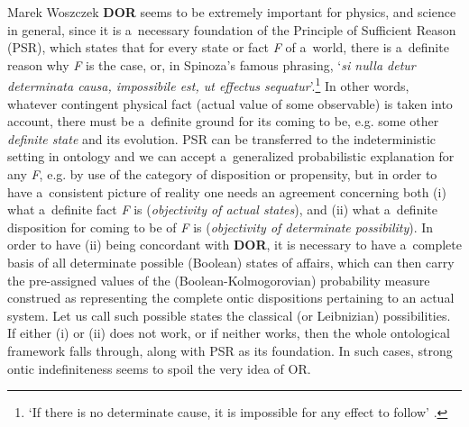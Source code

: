 \begin{artengenv}{Marek Woszczek}
\textbf{DOR} seems to be extremely important for physics, and science in general, since it is a~necessary foundation of the Principle of Sufficient Reason (PSR), which states that for every state or fact \textit{F} of a~world, there is a~definite reason why \textit{F} is the case, or, in Spinoza's famous phrasing, ‘\textit{si nulla detur determinata causa, impossibile est, ut effectus sequatur}'.\footnote{‘If there is no determinate cause, it is impossible for any effect to follow'
\parencites[][]{}[][p.6]{spinoza_ethik_1977}.%
} In other words, whatever contingent physical fact (actual value of some observable) is taken into account, there must be a~definite ground for its coming to be, e.g. some other \textit{definite state} and its evolution. PSR can be transferred to the indeterministic setting in ontology and we can accept a~generalized probabilistic explanation for any \textit{F}, e.g. by use of the category of disposition or propensity, but in order to have a~consistent picture of reality one needs an agreement concerning both (i) what a~definite fact \textit{F} is (\textit{objectivity of actual states}), and (ii) what a~definite disposition for coming to be of \textit{F} is (\textit{objectivity of determinate possibility}). In order to have (ii) being concordant with \textbf{DOR}, it is necessary to have a~complete basis of all determinate possible (Boolean) states of affairs, which can then carry the pre-assigned values of the (Boolean-Kolmogorovian) probability measure construed as representing the complete ontic dispositions pertaining to an actual system. Let us call such possible states the classical (or Leibnizian) possibilities. If either (i) or (ii) does not work, or if neither works, then the whole ontological framework falls through, along with PSR as its foundation. In such cases, strong ontic indefiniteness seems to spoil the very idea of OR.


\end{artengenv}
